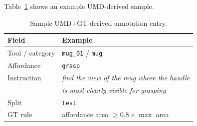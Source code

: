 Table~\ref{tab:sample-umd-entry} shows an example UMD-derived sample.

\begin{table}[htbp]
    \centering
    \caption{Sample UMD+GT-derived annotation entry.}
    \label{tab:sample-umd-entry}
    \begin{tabular}{ll}
        \hline
        Field & Example \\
        \hline
        Tool / category & \texttt{mug\_01} / \texttt{mug} \\
        Affordance & \texttt{grasp} \\
        Instruction & \textit{find the view of the mug where the handle} \\
         & \textit{is most clearly visible for grasping} \\
        Split & \texttt{test} \\
        GT rule & affordance area \(\geq 0.8 \times \max\) area \\
        \hline
    \end{tabular}
\end{table}
